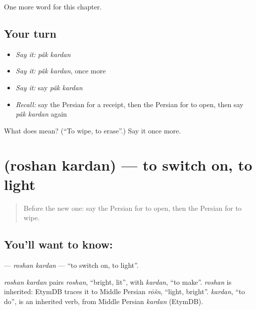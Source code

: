 \begin{grammarlens}[title={What you've built}]
One more word for this chapter.
\end{grammarlens}

\subsection*{Your turn}
\begin{itemize}
\raggedright
  \item \emph{Say it:} \emph{pâk kardan}
  \item \emph{Say it:} \emph{pâk kardan}, once more
  \item \emph{Say it:} say \emph{pâk kardan}
  \item \emph{Recall:} say the Persian for a receipt, then the Persian for to open, then say \emph{pâk kardan} again
\end{itemize}

\begin{tcolorbox}[breakable,colback=teal!4,colframe=teal!35!black,title={Before you move on}]
What does   mean? (\textquotedblleft{}To wipe, to erase\textquotedblright{}.) Say it once more.
\end{tcolorbox}
\section[\texorpdfstring{\fa{روشن} \fa{کردن} (roshan kardan)}{روشن کردن (roshan kardan)}]{  (roshan kardan) — to switch on, to light}

\label{lesson:FA-C140-roshan-kardan}



\begin{quote}
Before the new one: say the Persian for to open, then the Persian for to wipe.
\end{quote}

\subsection*{You'll want to know:  }
\textbf{ } — \emph{roshan kardan} — \textquotedblleft{}to switch on, to light\textquotedblright{}.

\begin{cousinweb}
\emph{roshan kardan} pairs \emph{roshan}, \textquotedblleft{}bright, lit\textquotedblright{}, with \emph{kardan}, \textquotedblleft{}to make\textquotedblright{}. \emph{roshan} is inherited: EtymDB traces it to Middle Persian \emph{rōšn}, \textquotedblleft{}light, bright\textquotedblright{}. \emph{kardan}, \textquotedblleft{}to do\textquotedblright{}, is an inherited verb, from Middle Persian \emph{kardan} (EtymDB).
\end{cousinweb}

